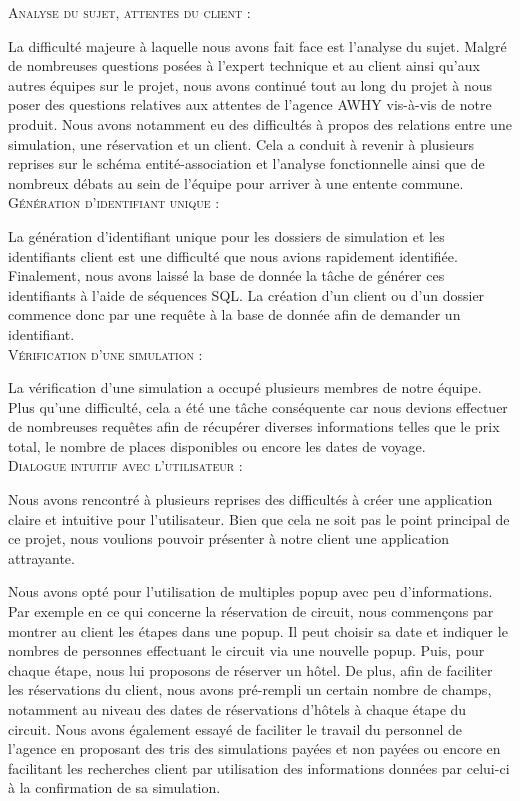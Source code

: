\documentclass[french]{article}
\theoremstyle{break}
\begin{document}
\textsc{Analyse du sujet, attentes du client :}
\vspace{0.3cm}

La difficulté majeure à laquelle nous avons fait face est l'analyse du sujet. Malgré de nombreuses questions posées à l'expert technique et au client ainsi qu'aux autres équipes sur le projet, nous avons continué tout au long du projet à nous poser des questions relatives aux attentes de l'agence AWHY vis-à-vis de notre produit.
Nous avons notamment eu des difficultés à propos des relations entre une simulation, une réservation et un client. Cela a conduit à revenir à plusieurs reprises sur le schéma entité-association et l'analyse fonctionnelle ainsi que de nombreux débats au sein de l'équipe pour arriver à une entente commune. \\


\textsc{Génération d'identifiant unique :}
\vspace{0.3cm}

La génération d'identifiant unique pour les dossiers de simulation et les identifiants client est une difficulté que nous avions rapidement identifiée. Finalement, nous avons laissé la base de donnée la tâche de générer ces identifiants à l'aide de séquences SQL. La création d'un client ou d'un dossier commence donc par une requête à la base de donnée afin de demander un identifiant. \\


\textsc{Vérification d'une simulation :}
\vspace{0.3cm}

La vérification d'une simulation a occupé plusieurs membres de notre équipe. Plus qu'une difficulté, cela a été une tâche conséquente car nous devions effectuer de nombreuses requêtes afin de récupérer diverses informations telles que le prix total, le nombre de places disponibles ou encore les dates de voyage. \\


\textsc{Dialogue intuitif avec l'utilisateur :}
\vspace{0.3cm}

Nous avons rencontré à plusieurs reprises des difficultés à créer une application claire et intuitive pour l'utilisateur. Bien que cela ne soit pas le point principal de ce projet, nous voulions pouvoir présenter à notre client une application attrayante.

Nous avons opté pour l'utilisation de multiples popup avec peu d'informations. Par exemple en ce qui concerne la réservation de circuit, nous commençons par montrer au client les étapes dans une popup. Il peut choisir sa date et indiquer le nombres de personnes effectuant le circuit via une nouvelle popup. Puis, pour chaque étape, nous lui proposons de réserver un hôtel. De plus, afin de faciliter les réservations du client, nous avons pré-rempli un certain nombre de champs, notamment au niveau des dates de réservations d'hôtels à chaque étape du circuit. Nous avons également essayé de faciliter le travail du personnel de l'agence en proposant des tris des simulations payées et non payées ou encore en facilitant les recherches client par utilisation des informations données par celui-ci à la confirmation de sa simulation.
\end{document}
